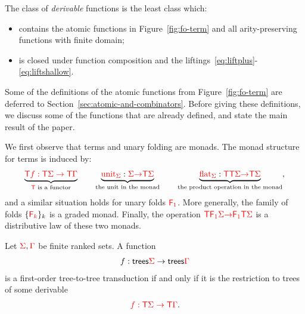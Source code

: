 \begin{definition}
    The class of \emph{derivable} functions is the least class which:
    \begin{itemize}
        \item contains the atomic functions in Figure~\ref{fig:fo-term} and all arity-preserving functions with finite domain;
        \item is closed under  function composition and the liftings~\eqref{eq:liftplus}-\eqref{eq:liftshallow}.
    \end{itemize}
\end{definition}



Some of the definitions of the atomic functions from Figure~\ref{fig:fo-term} are deferred to Section~\ref{sec:atomic-and-combinators}. Before giving these definitions, we discuss some of the functions that are already defined, and state the main result of the paper. 

We first observe that terms and unary folding are monads. 
The monad structure for terms is induced by:
\begin{align*}
        \underbrace{{\color{red}{{\color{red}{\mathsf T}}f : {\color{red}{\mathsf T}}\Sigma \to {\color{red}{\mathsf T}}\Gamma}}}_{\text{${\color{red}{\mathsf T}}$ is a functor}} \qquad  \underbrace{{\color{red}{\mathrm{unit}}}_{\color{red}{\Sigma}} : {\color{red}{\Sigma}} {\color{red}{\to}} {\color{red}{\mathsf T}} {\color{red}{\Sigma}}}_{\text{the unit in the monad}} \qquad  \underbrace{{\color{red}{\mathrm{flat}}}_{\color{red}{\Sigma}} : {\color{red}{\mathsf T}} {\color{red}{\mathsf T}} {\color{red}{\Sigma}} {\color{red}{\to}} {\color{red}{\mathsf T}} {\color{red}{\Sigma}}}_{\text{the product operation in the monad}},
\end{align*}
and a similar situation holds for unary folds $\reduce 1$.  More generally, the family of folds $\{{\color{red}{\mathsf F_{k}}}\}_{k}$ is a graded monad. Finally, the operation ${\color{red}{\mathsf T}} {\color{red}{\mathsf F_{1}}}{\color{red}{\Sigma}} {\color{red}{\to}} {\color{red}{\mathsf F_{1}}}{\color{red}{\mathsf T}} {\color{red}{\Sigma}}$ is a distributive law of these two monads.




\begin{theorem}\label{thm:main}
    Let ${\color{red}{\Sigma}},{\color{red}{\Gamma}}$ be finite ranked sets. A function 
    \begin{align*}
        f : \mathsf {trees} {\color{red}{\Sigma}} \to \mathsf {trees} {\color{red}{\Gamma}}
    \end{align*}
    is a first-order tree-to-tree transduction if and only if it is the restriction to trees of some derivable
    \begin{align*}
        {\color{red}{f : {\color{red}{\mathsf T}}\Sigma \to {\color{red}{\mathsf T}}\Gamma}}.
    \end{align*}
    
\end{theorem}




